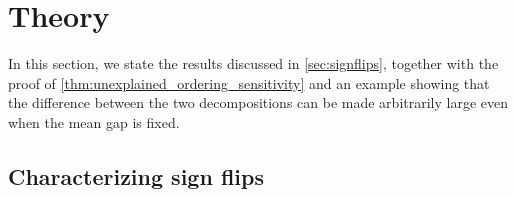 \section{Theory}
\label{app:theory}

In this section, we state the results discussed in \cref{sec:signflips}, together with the proof of \cref{thm:unexplained_ordering_sensitivity} and an example showing that the difference between the two decompositions can be made arbitrarily large even when the mean gap is fixed.


\subsection{Characterizing sign flips}
\label{sec:sign_flip_characterizations}




